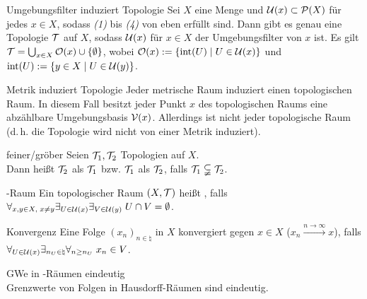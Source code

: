 \begin{Satz}{Umgebungsfilter induziert Topologie}
    Sei $X$ eine Menge und $\mathcal{U}(x) \subset \mathcal{P}(X)$ für jedes $x \in X$,
    sodass \emph{(1)} bis \emph{(4)} von eben erfüllt sind.
    Dann gibt es genau eine Topologie $\mathcal{T}$ auf $X$, sodass $\mathcal{U}(x)$ für $x \in X$ der
    Umgebungsfilter von $x$ ist.
    Es gilt $\mathcal{T} = \bigcup_{x \in X} \mathcal{O}(x) \cup \{\emptyset\}$,
    wobei $\mathcal{O}(x) := \{\operatorname{int}(U) \;|\; U \in \mathcal{U}(x)\}$ und
    $\operatorname{int}(U) := \{y \in X \;|\; U \in \mathcal{U}(y)\}$.
\end{Satz}

\linie
\pagebreak

\begin{Satz}{Metrik induziert Topologie}
    Jeder metrische Raum induziert einen topologischen Raum.
    In diesem Fall besitzt jeder Punkt $x$ des topologischen Raums eine abzählbare
    Umgebungsbasis $\mathcal{V}(x)$.
    Allerdings ist nicht jeder topologische Raum 
    (d.\,h. die Topologie wird nicht von einer Metrik induziert).
\end{Satz}

\begin{Def}{feiner/gröber}
    Seien $\mathcal{T}_1, \mathcal{T}_2$ Topologien auf $X$.\\
    Dann heißt $\mathcal{T}_2$  als $\mathcal{T}_1$ bzw.
    $\mathcal{T}_1$  als $\mathcal{T}_2$, falls $\mathcal{T}_1 \subsetneqq \mathcal{T}_2$.
\end{Def}

\begin{Def}{-Raum}
    Ein topologischer Raum $(X, \mathcal{T})$ heißt , falls\\
    $\forall_{x, y \in X,\; x \not= y} \exists_{U \in \mathcal{U}(x)} \exists_{V \in \mathcal{U}(y)}\;
    U \cap V = \emptyset$.
\end{Def}

\begin{Def}{Konvergenz}
    Eine Folge $(x_n)_{n \in \natural}$ in $X$ konvergiert gegen $x \in X$
    ($x_n \xrightarrow{n \to \infty} x$), falls\\
    $\forall_{U \in \mathcal{U}(x)} \exists_{n_U \in \natural} \forall_{n \ge n_U}\; x_n \in V$.
\end{Def}

\begin{Satz}{GWe in -Räumen eindeutig}\\
    Grenzwerte von Folgen in Hausdorff-Räumen sind eindeutig.
\end{Satz}

